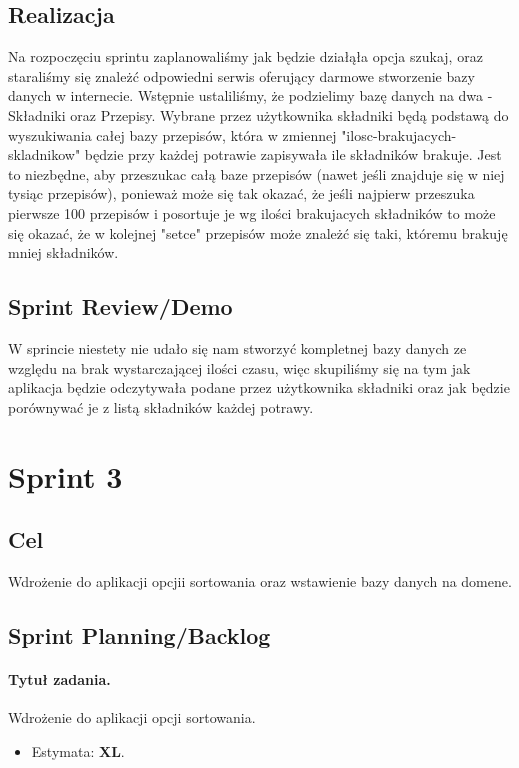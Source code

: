 \documentclass[a4paper]{article}
\begin{document}
	\subsection{Realizacja}
	Na rozpoczęciu sprintu zaplanowaliśmy jak będzie działąła opcja szukaj, oraz staraliśmy się znależć odpowiedni serwis oferujący darmowe stworzenie bazy danych w internecie. Wstępnie ustaliliśmy, że podzielimy bazę danych na dwa - Składniki oraz Przepisy. Wybrane przez użytkownika składniki będą podstawą do wyszukiwania całej bazy przepisów, która w zmiennej "ilosc-brakujacych-skladnikow" będzie przy każdej potrawie zapisywała ile składników brakuje. Jest to niezbędne, aby przeszukac całą baze przepisów (nawet jeśli znajduje się w niej tysiąc przepisów), ponieważ może się tak okazać, że jeśli najpierw przeszuka pierwsze 100 przepisów i posortuje je wg ilości brakujacych składników to może się okazać, że w kolejnej "setce" przepisów może znależć się taki, któremu brakuję mniej składników.
	
	
	
	\subsection{Sprint Review/Demo}
W sprincie niestety nie udało się nam stworzyć kompletnej bazy danych ze względu na brak wystarczającej ilości czasu, więc skupiliśmy się na tym jak aplikacja będzie odczytywała podane przez użytkownika składniki oraz jak będzie porównywać je z listą składników każdej potrawy.
	
	
	\section{Sprint 3}
	
	\subsection{Cel} Wdrożenie do aplikacji opcjii sortowania oraz wstawienie bazy danych na domene.
	
	\subsection{Sprint Planning/Backlog}
	
	\paragraph{Tytuł zadania.} Wdrożenie do aplikacji opcji sortowania.
	\begin{itemize}
		\item Estymata: \textbf{XL}.
	\end{itemize}
\end{document}
